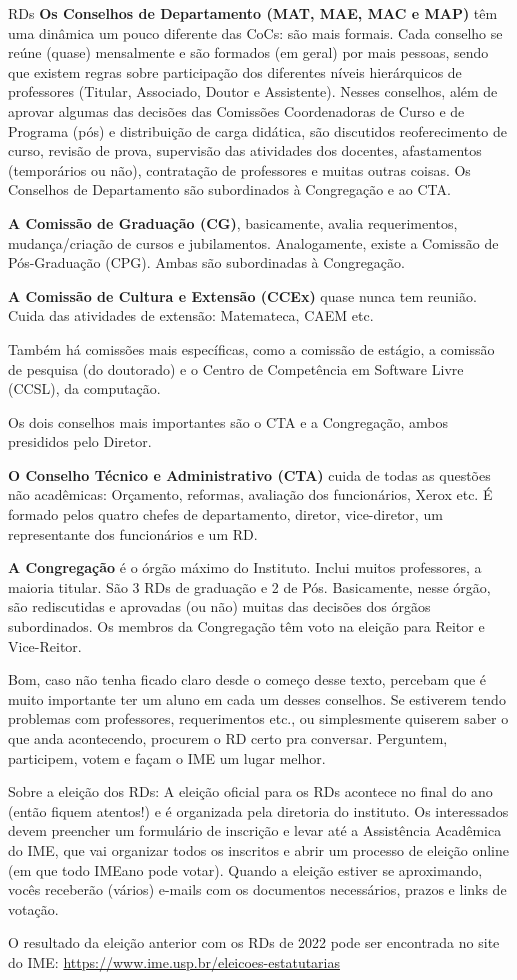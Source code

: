 \begin{subsecao}{RDs}
{\bf Os Conselhos de Departamento (MAT, MAE, MAC e MAP)} têm uma dinâmica um
pouco diferente das CoCs: são mais formais. Cada conselho se reúne (quase)
mensalmente e são formados (em geral) por mais pessoas, sendo que existem
regras sobre participação dos diferentes níveis hierárquicos de
professores (Titular, Associado, Doutor e Assistente). Nesses conselhos, além
de aprovar algumas das decisões das Comissões Coordenadoras de Curso e de
Programa (pós) e distribuição de carga didática, são discutidos reoferecimento
de curso, revisão de prova, supervisão das atividades dos docentes,
afastamentos (temporários ou não), contratação de professores e muitas outras
coisas.
Os Conselhos de Departamento são subordinados à Congregação e ao CTA.

{\bf A Comissão de Graduação (CG)}, basicamente, avalia requerimentos,
mudança/criação de cursos e jubilamentos. Analogamente, existe a Comissão de
Pós-Graduação (CPG). Ambas são subordinadas à Congregação.

{\bf A Comissão de Cultura e Extensão (CCEx)} quase nunca tem reunião. Cuida
das atividades de extensão: Matemateca, CAEM etc.

Também há comissões mais específicas, como a comissão de estágio, a comissão de
pesquisa (do doutorado) e o Centro de Competência em Software Livre (CCSL), da
computação.

Os dois conselhos mais importantes são o CTA e a Congregação, ambos presididos
pelo Diretor.

{\bf O Conselho Técnico e Administrativo (CTA)} cuida de todas as questões não
acadêmicas: Orçamento, reformas, avaliação dos funcionários, Xerox etc. É
formado pelos quatro chefes de departamento, diretor, vice-diretor, um
representante dos funcionários e um RD.

{\bf A Congregação} é o órgão máximo do Instituto. Inclui muitos professores, a
maioria titular. São 3 RDs de graduação e 2 de Pós. Basicamente,
nesse órgão, são rediscutidas e aprovadas (ou não) muitas das decisões
dos órgãos subordinados. Os membros da Congregação têm voto na eleição para
Reitor e Vice-Reitor.

Bom, caso não tenha ficado claro desde o começo desse texto, percebam que é
muito importante ter um aluno em cada um desses conselhos. Se estiverem tendo
problemas com professores, requerimentos etc., ou simplesmente quiserem saber
o que anda acontecendo, procurem o RD certo pra conversar. Perguntem,
participem, votem e façam o IME um lugar melhor.

Sobre a eleição dos RDs: A eleição oficial para os RDs acontece no final do ano
(então fiquem atentos!) e é organizada pela diretoria do instituto. Os
interessados devem preencher um formulário de inscrição e levar até a
Assistência Acadêmica do IME, que vai organizar todos os inscritos e abrir um
processo de eleição online (em que todo IMEano pode votar). Quando a eleição
estiver se aproximando, vocês receberão (vários) e-mails com os documentos
necessários, prazos e links de votação.

O resultado da eleição anterior com os RDs de 2022 pode ser encontrada no site
do IME:
\url{https://www.ime.usp.br/eleicoes-estatutarias}

\end{subsecao}

